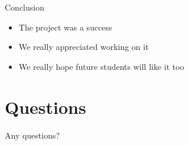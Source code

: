 \documentclass{beamer}
\begin{document}
    \begin{frame}{Conclusion}
      \begin{itemize}
        \item The project was a success
        \item We really appreciated working on it
        \item We really hope future students will like it too
      \end{itemize}
    \end{frame}

  \section{Questions}
    \begin{frame}
      Any questions?
    \end{frame}
\end{document}
